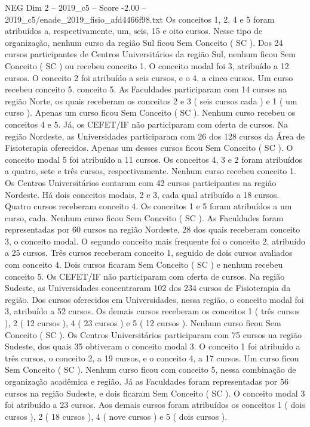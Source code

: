\begin{textsample}{NEG Dim 2 – 2019\_c5 – Score -2.00 – 2019\_c5/enade\_2019\_fisio\_afd4466f98.txt}
Os conceitos 1, 2, 4 e 5 foram atribuídos a, respectivamente, um, seis, 15 e oito cursos.
Nesse tipo de organização, nenhum curso da região Sul ficou Sem Conceito ( SC ).
Dos 24 cursos participantes de Centros Universitários da região Sul, nenhum ficou Sem Conceito ( SC ) ou recebeu conceito 1.
O conceito modal foi 3, atribuído a 12 cursos.
O conceito 2 foi atribuído a seis cursos, e o 4, a cinco cursos.
Um curso recebeu conceito 5. conceito 5.
As Faculdades participaram com 14 cursos na região Norte, os quais receberam os conceitos 2 e 3 ( seis cursos cada ) e 1 ( um curso ).
Apenas um curso ficou Sem Conceito ( SC ).
Nenhum curso recebeu os conceitos 4 e 5.
Já, os CEFET/IF não participaram com oferta de cursos.
Na região Nordeste, as Universidades participaram com 26 dos 128 cursos da Área de Fisioterapia oferecidos.
Apenas um desses cursos ficou Sem Conceito ( SC ).
O conceito modal 5 foi atribuído a 11 cursos.
Os conceitos 4, 3 e 2 foram atribuídos a quatro, sete e três cursos, respectivamente.
Nenhum curso recebeu conceito 1.
Os Centros Universitários contaram com 42 cursos participantes na região Nordeste.
Há dois conceitos modais, 2 e 3, cada qual atribuído a 18 cursos.
Quatro cursos receberam conceito 4.
Os conceitos 1 e 5 foram atribuídos a um curso, cada.
Nenhum curso ficou Sem Conceito ( SC ).
As Faculdades foram representadas por 60 cursos na região Nordeste, 28 dos quais receberam conceito 3, o conceito modal.
O segundo conceito mais frequente foi o conceito 2, atribuído a 25 cursos.
Três cursos receberam conceito 1, seguido de dois cursos avaliados com conceito 4.
Dois cursos ficaram Sem Conceito ( SC ) e nenhum recebeu conceito 5.
Os CEFET/IF não participaram com oferta de cursos.
Na região Sudeste, as Universidades concentraram 102 dos 234 cursos de Fisioterapia da região.
Dos cursos oferecidos em Universidades, nessa região, o conceito modal foi 3, atribuído a 52 cursos.
Os demais cursos receberam os conceitos 1 ( três cursos ), 2 ( 12 cursos ), 4 ( 23 cursos ) e 5 ( 12 cursos ).
Nenhum curso ficou Sem Conceito ( SC ).
Os Centros Universitários participaram com 75 cursos na região Sudeste, dos quais 35 obtiveram o conceito modal 3.
O conceito 1 foi atribuído a três cursos, o conceito 2, a 19 cursos, e o conceito 4, a 17 cursos.
Um curso ficou Sem Conceito ( SC ).
Nenhum curso ficou com conceito 5, nessa combinação de organização acadêmica e região.
Já as Faculdades foram representadas por 56 cursos na região Sudeste, e dois ficaram Sem Conceito ( SC ).
O conceito modal 3 foi atribuído a 23 cursos.
Aos demais cursos foram atribuídos os conceitos 1 ( dois cursos ), 2 ( 18 cursos ), 4 ( nove cursos ) e 5 ( dois cursos ).

\end{textsample}

